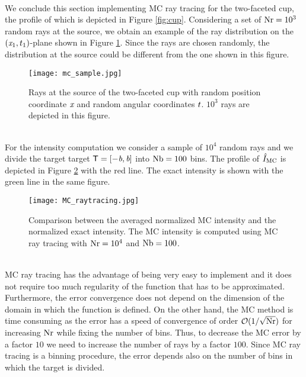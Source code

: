 \\ \indent
We conclude this section implementing MC ray tracing for the two-faceted cup, the profile of which is depicted in Figure \ref{fig:cup}. 
Considering a set of $\textrm{Nr} = 10^3$ random rays 
at the source, we obtain an example of the ray distribution on the $(\textit{x}_1, t_1)$-plane shown in Figure \ref{fig:mc_sample1}. 
Since the rays are chosen randomly, the distribution at the source could be different from the one shown in this figure.
\begin{figure}[h]
\begin{center}
    \texttt{[image: mc\_sample.jpg]}
    \caption{Rays at the source of the two-faceted cup with random position coordinate $\textit{x}$ and random angular coordinates $t$. $10^3$ rays are depicted in this figure.}
    \label{fig:mc_sample1}
\end{center}
  \end{figure}
\\ \indent For the intensity computation we consider a sample of $10^4$ random rays and we divide the target target $\textsf{T} = [-\textit{b}, \textit{b}]$ into $\textrm{Nb}= 100$ bins.
The profile of $\hat{I}_{\textrm{MC}}$ is depicted in Figure \ref{fig:mc_intensity} with the red line. The exact intensity is shown with the green line in the same figure.
\begin{figure}[t]
\begin{center}
    \texttt{[image: MC\_raytracing.jpg]}
    \caption{Comparison between the averaged normalized MC intensity and the normalized exact intensity. The MC intensity is computed using MC ray tracing with $\textrm{Nr} = 10^4$ and $\textrm{Nb} = 100$.}
   \label{fig:mc_intensity}
\end{center}
\end{figure}
\\ \indent MC ray tracing has the advantage of being very easy to implement and it does not require too much regularity of the function that has to be approximated. Furthermore, the error convergence does not depend on the dimension of the domain in which the function is defined.
On the other hand, the MC method is time consuming as the error has a speed of convergence of order $\mathcal{O}(1/\sqrt{\textrm{Nr}})$ for increasing $\textrm{Nr}$ while fixing the number of bins. 
Thus, to decrease the MC error by a factor $10$ we need to increase the number of rays by a factor $100$.
Since MC ray tracing is a binning procedure, the error depends also on the number of bins in which the target is divided. 

